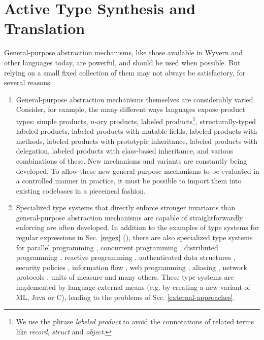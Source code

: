 


\section{Active Type Synthesis and Translation}\label{att}
General-purpose abstraction mechanisms, like those available in Wyvern and other languages today, are powerful, and should be used when possible. But relying on a small fixed collection of them may not always be satisfactory, for several reasons:
\begin{enumerate}
\item General-purpose abstraction mechanisms themselves are considerably varied. Consider, for example, the many different ways languages expose product types: simple products, $n$-ary products, labeled products\footnote{We use the phrase \emph{labeled product} to avoid the connotations of related terms like \emph{record}, \emph{struct} and \emph{object}.}, structurally-typed labeled products, labeled products with mutable fields, labeled products with methods, labeled products with prototypic inheritance, labeled products with delegation, labeled products with class-based inheritance, and various combinations of these. New mechanisms and variants are constantly being developed. To allow these new general-purpose mechanisms to be evaluated in a controlled manner in practice, it must be possible to import them into existing codebases in a piecemeal fashion.
\item Specialized type systems that directly enforce stronger invariants than general-purpose abstraction mechanisms are capable of straightforwardly enforcing are often developed. In addition to the examples of type systems for regular expressions in Sec. \ref{regex} (\cite{a,b}), there are also specialized type systems for parallel programming \cite{a,b}, concurrent programming \cite{cml,a,b}, distributed programming \cite{tom7}, reactive programming \cite{reactiveml}, authenticated data structures \cite{popl13}, security policies \cite{walker00}, information flow \cite{smith2001}, web programming \cite{sandholm00}, aliasing \cite{naden12}, network protocols \cite{sekar99}, units of measure \cite{keneddy} and many others. These type systems are implemented by language-external means (e.g. by creating a new variant of ML, Java or C), leading to the problems of Sec. \ref{external-approaches}. 

\end{enumerate}

